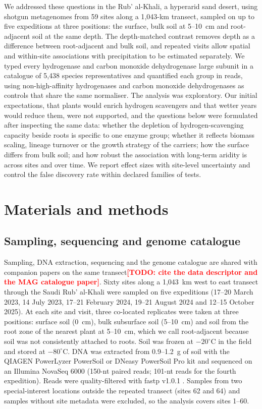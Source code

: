 \documentclass[11pt]{article}
\providecommand{\todo}[1]{\textcolor{red}{\textbf{[TODO: #1]}}}
\begin{document}
We addressed these questions in the Rub' al-Khali, a hyperarid sand desert, using shotgun metagenomes
from 59 sites along a 1{,}043-km transect, sampled on up to five expeditions at three positions: the
surface, bulk soil at 5--10~cm and root-adjacent soil at the same depth. The depth-matched contrast
removes depth as a difference between root-adjacent and bulk soil, and repeated visits allow spatial
and within-site associations with precipitation to be estimated separately. We typed every hydrogenase
and carbon monoxide dehydrogenase large subunit in a catalogue of 5{,}438 species representatives and
quantified each group in reads, using non-high-affinity hydrogenases and carbon monoxide dehydrogenases
as controls that share the same normaliser. The analysis was exploratory. Our initial expectations, that
plants would enrich hydrogen scavengers and that wetter years would reduce them, were not supported, and
the questions below were formulated after inspecting the same data: whether the depletion of
hydrogen-scavenging capacity beside roots is specific to one enzyme group; whether it reflects biomass
scaling, lineage turnover or the growth strategy of the carriers; how the surface differs from bulk
soil; and how robust the association with long-term aridity is across sites and over time. We report
effect sizes with site-level uncertainty and control the false discovery rate within declared families
of tests.

\section*{Materials and methods}

\subsection*{Sampling, sequencing and genome catalogue}
Sampling, DNA extraction, sequencing and the genome catalogue are shared with companion papers on the
same transect\todo{cite the data descriptor and the MAG catalogue paper}. Sixty sites along a 1{,}043~km
west to east transect through the Saudi Rub' al-Khali were sampled on five expeditions (17--20 March
2023, 14 July 2023, 17--21 February 2024, 19--21 August 2024 and 12--15 October 2025). At each site and
visit, three co-located replicates were taken at three positions: surface soil (0~cm), bulk subsurface
soil (5--10~cm) and soil from the root zone of the nearest plant at 5--10~cm, which we call
root-adjacent because soil was not consistently attached to roots. Soil was frozen at $-20^\circ$C in the
field and stored at $-80^\circ$C. DNA was extracted from 0.9--1.2~g of soil with the QIAGEN PowerLyzer
PowerSoil or DNeasy PowerSoil Pro kit and sequenced on an Illumina NovaSeq 6000 (150-nt paired reads;
101-nt reads for the fourth expedition). Reads were quality-filtered with fastp v1.0.1
\citep{chen2018fastp}. Samples from two special-interest locations outside the repeated transect (sites
62 and 64) and samples without site metadata were excluded, so the analysis covers sites 1--60.
\end{document}
